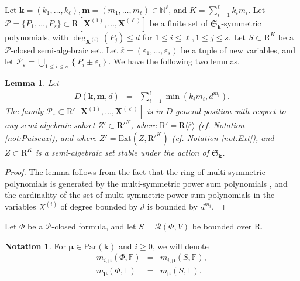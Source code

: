 \documentclass{amsart}
\newtheorem{lemma}{Lemma}
\theoremstyle{definition}
\newtheorem{notation}{Notation}
\theoremstyle{remark}
\numberwithin{equation}{section}
\begin{document}
Let ${\mathbf{k}}=(k_1,\ldots,k_\ell),
{\mathbf{m}} =(m_1,\ldots,m_\ell)\in  {\mathbb{N}}^\ell$, and $K = \sum_{i=1}^{\ell} k_i m_i$.
Let 
$\mathcal{P} = \{P_1,\ldots, P_s\} \subset {\mathrm{R}}[{\mathbf{X}}^{(1)},\ldots,{\mathbf{X}}^{(\ell)}]$
be a finite set of $\mathfrak{S}_{\mathbf{k}}$-symmetric polynomials, with
$\deg_{{\mathbf{X}}^{(i)}}(P_j) \leq d$ for $1\leq i \leq \ell, 1\leq j \leq s$.
Let  
$S \subset {\mathrm{R}}^K$  be a $\mathcal{P}$-closed semi-algebraic set.
Let $\overline{{\varepsilon}} = \left({{\varepsilon}}_{1} , \ldots , {{\varepsilon}}_{s} \right)$
be a tuple of new variables, and let $\mathcal{P}_{\overline{{\varepsilon}}} =
\bigcup_{1 \leq i \leq s} \left\{ P_{i}   \pm {{\varepsilon}}_{i} \right\}$. We have the
following two lemmas.

\begin{lemma}
  \label{lem:gen-pos1-with-parameters}Let
  \begin{eqnarray*}
    D (\mathbf{k},\mathbf{m},d) & = & \sum_{i=1}^{\ell} \min (k_{i}m_i ,d^{m_i}) .
  \end{eqnarray*}
  The family $\mathcal{P}_{\overline{{\varepsilon}}} \subset {\mathrm{R}}'[{\mathbf{X}}^{(1)} , \ldots ,{\mathbf{X}}^{(\ell)}]$ is in $D$-general position with respect to any semi-algebraic subset $Z' \subset {\mathrm{R}}'^K$, 
where ${\mathrm{R}}' = {\mathrm{R}} \langle \overline{{\varepsilon}} \rangle$ (cf. Notation \ref{not:Puiseux}), and
where $Z' = {\mathrm{Ext}}(Z,{\mathrm{R}}'^K)$ (cf. Notation \ref{not:Ext}), and $Z\subset {\mathrm{R}}^{K}$ is a semi-algebraic set stable under the action of $\mathfrak{S}_{\mathbf{k}}$.
  \end{lemma}

\begin{proof}
The lemma follows from the fact that the ring of multi-symmetric polynomials is generated by the
multi-symmetric power sum polynomials \cite[Theorem 1.2]{Dalbec}, and the cardinality of the
set of multi-symmetric power sum polynomials in the variables $X^{(i)}$ of degree bounded by $d$
is bounded by $d^{m_i}$.
\end{proof}

Let $\Phi$ be a $\mathcal{P}$-closed formula, and let $S= {{\mathcal R}} (\Phi ,V)$ be
bounded over ${\mathrm{R}}$.
\begin{notation}
For $\pmb{\mu} \in {\mathrm{Par}}({\mathbf{k}})$ and $i \geq 0$, we will denote
\begin{eqnarray*}
m_{i,\pmb{\mu}}(\Phi,{\mathbb{F}}) &=&  m_{i,\pmb{\mu}}(S,{\mathbb{F}}), \\
m_{\pmb{\mu}}(\Phi,{\mathbb{F}}) &=&  m_{\pmb{\mu}}(S,{\mathbb{F}}).
\end{eqnarray*}
\end{notation}
  
\end{document}
